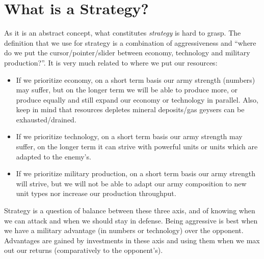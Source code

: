 \section{What is a Strategy?}


As it is an abstract concept, what constitutes \textit{strategy} is hard to grasp. The definition that we use for strategy is a combination of aggressiveness and ``where do we put the cursor/pointer/slider between economy, technology and military production?''. It is very much related to where we put our resources:
\begin{itemize}
    \item If we prioritize economy, on a short term basis our army strength (numbers) may suffer, but on the longer term we will be able to produce more, or produce equally and still expand our economy or technology in parallel. Also, keep in mind that resources depletes mineral deposits/gas geysers can be exhausted/drained.
    \item If we prioritize technology, on a short term basis our army strength may suffer, on the longer term it can strive with powerful units or units which are adapted to the enemy's.
    \item If we prioritize military production, on a short term basis our army strength will strive, but we will not be able to adapt our army composition to new unit types nor increase our production throughput.
\end{itemize}
Strategy is a question of balance between these three axis, and of knowing when we can attack and when we should stay in defense. Being aggressive is best when we have a military advantage (in numbers or technology) over the opponent. Advantages are gained by investments in these axis and using them when we max out our returns (comparatively to the opponent's).

